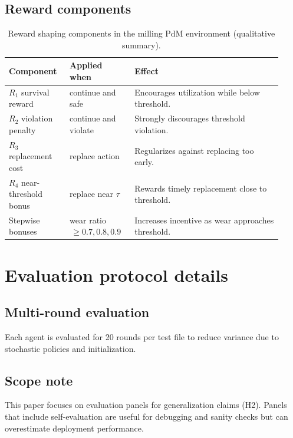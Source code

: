 \documentclass[sn-basic]{sn-jnl} %
\begin{document}
\begin{appendices}
\subsection{Reward components}
\begin{table}[htbp]
		\centering
		\caption{Reward shaping components in the milling PdM environment (qualitative summary).}
		\label{tab:reward_components}
		\begin{tabular}{p{0.20\linewidth} p{0.22\linewidth} p{0.50\linewidth}}
				\toprule
				\textbf{Component} & \textbf{Applied when} & \textbf{Effect}\\
				\midrule
				$R_1$ survival reward & continue and safe & Encourages utilization while below threshold.\\
				$R_2$ violation penalty & continue and violate & Strongly discourages threshold violation.\\
				$R_3$ replacement cost & replace action & Regularizes against replacing too early.\\
				$R_4$ near-threshold bonus & replace near $\tau$ & Rewards timely replacement close to threshold.\\
				Stepwise bonuses & wear ratio $\,\ge 0.7, 0.8, 0.9$ & Increases incentive as wear approaches threshold.\\
				\bottomrule
		\end{tabular}
\end{table}

\section{Evaluation protocol details}
\label{app:eval}
\subsection{Multi-round evaluation}
Each agent is evaluated for 20 rounds per test file to reduce variance due to stochastic policies and initialization.

\subsection{Scope note}
This paper focuses on evaluation panels for generalization claims (H2). Panels that include self-evaluation are useful for debugging and sanity checks but can overestimate deployment performance.


\end{appendices}
\end{document}
